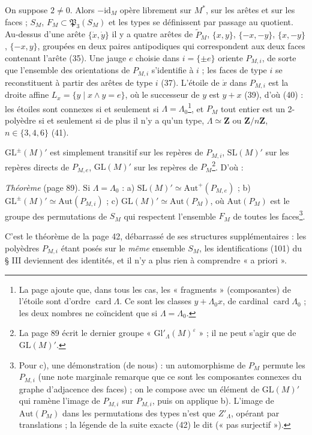 \documentclass[11pt,a4paper]{article}
\begin{document}
On suppose $2 \neq 0$. Alors $-\mathrm{id}_M$ opère librement sur $M^{*}$, sur
les arêtes et sur les faces ; $S_M$, $F_M \subset \mathfrak{P}_3(S_M)$ et les
types se définissent par passage au quotient. Au-dessus d'une arête $\{\dot x,
\dot y\}$ il y a quatre arêtes de $\widetilde{P}_M$, $\{x, y\}$, $\{-x, -y\}$,
$\{x, -y\}$, $\{-x, y\}$, groupées en deux paires antipodiques qui
correspondent aux deux faces contenant l'arête (35). Une jauge $e$ choisie dans
$i = \{\pm e\}$ oriente $P_{M,i}$, de sorte que l'ensemble des orientations de
$P_{M,i}$ s'identifie à $i$ ; les faces de type $i$ se reconstituent à partir des
arêtes de type $i$ (37). L'étoile de $\dot x$ dans $P_{M,i}$ est la droite
affine $L_x = \{y \mid x \wedge y = e\}$, où le successeur de $y$ est $y + x$
(39), d'où (40) : les étoiles sont connexes si et seulement si $\Lambda =
\Lambda_0$\footnote{La page ajoute que, dans tous les cas, les « fragments »
(composantes) de l'étoile sont d'ordre $\operatorname{card}\Lambda$. Ce sont
les classes $y + \Lambda_0 x$, de cardinal $\operatorname{card}\Lambda_0$ ; les
deux nombres ne coïncident que si $\Lambda = \Lambda_0$.}, et $P_M$ tout entier
est un 2-polyèdre si et seulement si de plus il n'y a qu'un type, $\Lambda
\simeq \mathbf{Z}$ ou $\mathbf{Z}/n\mathbf{Z}$, $n \in \{3, 4, 6\}$ (41).

$\mathrm{GL}^{\pm}(M)'$ est simplement transitif sur les repères de $P_{M,i}$,
$\mathrm{SL}(M)'$ sur les repères directs de $P_{M,e}$, $\mathrm{GL}(M)'$ sur
les repères de $P_M$\footnote{La page 89 écrit le dernier groupe
« $\mathrm{Gl}'_\Lambda(M)^{\varepsilon}$ » ; il ne peut s'agir que de
$\mathrm{GL}(M)'$.}. D'où :

\emph{Théorème} (page 89). Si $\Lambda = \Lambda_0$ : a) $\mathrm{SL}(M)'
\simeq \mathrm{Aut}^{+}(P_{M,e})$ ; b) $\mathrm{GL}^{\pm}(M)' \simeq
\mathrm{Aut}(P_{M,i})$ ; c) $\mathrm{GL}(M)' \simeq \mathrm{Aut}(P_M)$, où
$\mathrm{Aut}(P_M)$ est le groupe des permutations de $S_M$ qui respectent
l'ensemble $F_M$ de toutes les faces\footnote{Pour c), une démonstration
(de nous) : un automorphisme de $P_M$ permute les $P_{M,i}$ (une note marginale
remarque que ce sont les composantes connexes du graphe d'adjacence des
faces) ; on le compose avec un élément de $\mathrm{GL}(M)'$ qui ramène l'image
de $P_{M,i}$ sur $P_{M,i}$, puis on applique b). L'image de $\mathrm{Aut}(P_M)$
dans les permutations des types n'est que $Z'_\Lambda$, opérant par
translations ; la légende de la suite exacte (42) le dit (« pas
surjectif »).}.

C'est le théorème de la page 42, débarrassé de ses structures supplémentaires :
les polyèdres $P_{M,i}$ étant posés sur le \emph{même} ensemble $S_M$, les
identifications (101) du § III deviennent des identités, et il n'y a plus rien
à comprendre « a priori ».
\end{document}
